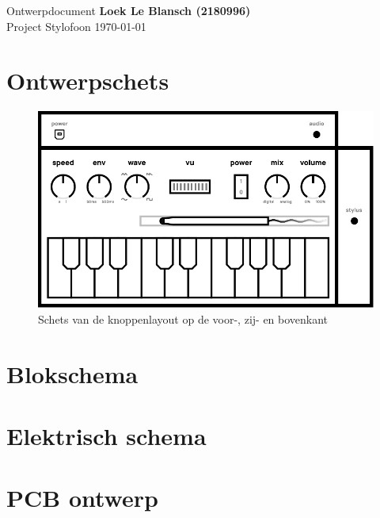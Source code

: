 \documentclass[12pt, a4paper, dutch]{article}
\begin{document}
Ontwerpdocument \hfill \textbf{Loek Le Blansch (2180996)}\\
Project Stylofoon \hfill \today
\medskip

\section{Ontwerpschets}

\begin{figure}[H]
	\centering
	\includegraphics{figs/case-layout-sketch.pdf}
	\caption{Schets van de knoppenlayout op de voor-, zij- en bovenkant}
\end{figure}

\section{Blokschema}



\section{Elektrisch schema}
\section{PCB ontwerp}
\end{document}
